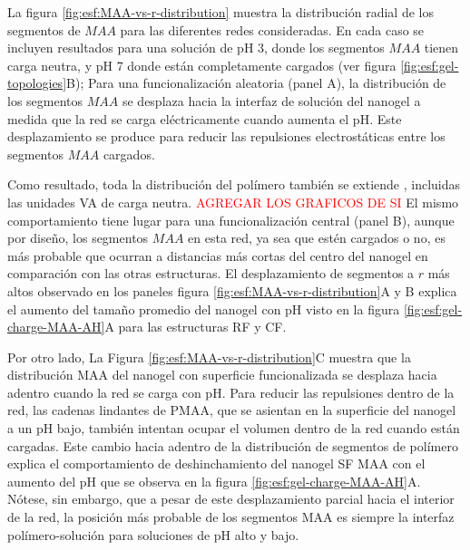 La figura \ref{fig:esf:MAA-vs-r-distribution} muestra la distribuci\'on radial de los segmentos de $MAA$ para las diferentes redes consideradas.
En cada caso se incluyen  resultados para una solución de pH 3, donde los segmentos $MAA$ tienen carga neutra, y pH 7 donde est\'an completamente cargados (ver figura \ref{fig:esf:gel-topologies}B);
Para una funcionalizaci\'on aleatoria (panel A), la distribuci\'on de los segmentos $MAA$ se desplaza hacia la interfaz de soluci\'on del nanogel a medida que la red se carga el\'ectricamente cuando aumenta el pH.
Este desplazamiento se produce para reducir las repulsiones electrost\'aticas entre los segmentos $MAA$ cargados.

Como resultado, toda la distribuci\'on del pol\'imero tambi\'en se extiende %
, incluidas las unidades VA de carga neutra. \textcolor{red}{AGREGAR LOS GRAFICOS DE SI}
El mismo comportamiento tiene lugar para una funcionalizaci\'on central (panel B),
aunque por dise\~no, los segmentos $MAA$ en esta red, ya sea que est\'en cargados o no, es m\'as probable que ocurran a distancias m\'as cortas del centro del nanogel en comparaci\'on con las otras estructuras.
El desplazamiento de segmentos a $r$ m\'as altos observado en los paneles figura \ref{fig:esf:MAA-vs-r-distribution}A y B explica el aumento del tama\~no promedio del nanogel con pH visto en la figura \ref{fig:esf:gel-charge-MAA-AH}A para las estructuras RF y CF.


Por otro lado,
La Figura \ref{fig:esf:MAA-vs-r-distribution}C muestra que la distribuci\'on MAA del nanogel con superficie funcionalizada se desplaza hacia adentro cuando la red se carga con pH.
Para reducir las repulsiones dentro de la red, las cadenas lindantes de PMAA, que se asientan en la superficie del nanogel a un pH bajo, tambi\'en intentan ocupar el volumen dentro de la red cuando están cargadas.
Este cambio hacia adentro de la distribuci\'on de segmentos de pol\'imero %
explica el comportamiento de deshinchamiento del nanogel SF MAA con el aumento del pH que se observa en la figura \ref{fig:esf:gel-charge-MAA-AH}A.
N\'otese, sin embargo, que a pesar de este desplazamiento parcial hacia el interior de la red, la posici\'on m\'as probable de los segmentos MAA es siempre la interfaz pol\'imero-soluci\'on para soluciones de pH alto y bajo.



